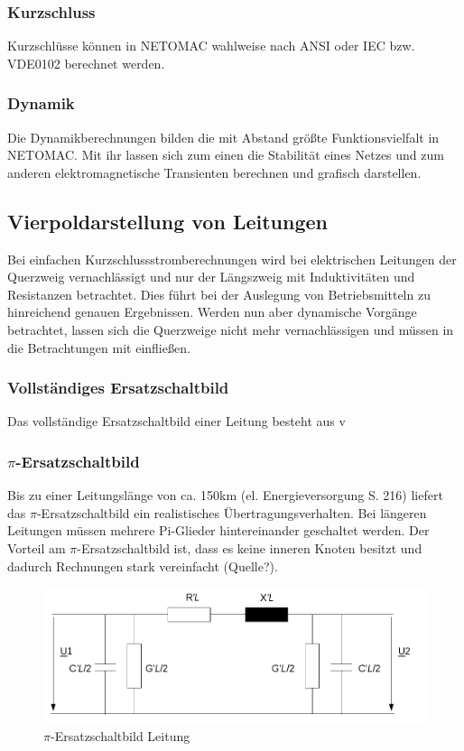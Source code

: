 \documentclass{scrartcl}
\begin{document}
\begin{onehalfspace}
\subsubsection{Kurzschluss}
Kurzschlüsse können in NETOMAC wahlweise nach ANSI oder IEC bzw. VDE0102 berechnet werden.


\subsubsection{Dynamik}
Die Dynamikberechnungen bilden die mit Abstand größte Funktionsvielfalt in NETOMAC. Mit ihr lassen sich zum einen die Stabilität eines Netzes und zum anderen elektromagnetische Transienten berechnen und grafisch darstellen.

\subsection{Vierpoldarstellung von Leitungen}
Bei einfachen Kurzschlussstromberechnungen wird bei elektrischen Leitungen der Querzweig vernachlässigt und nur der Längszweig mit Induktivitäten und Resistanzen betrachtet. Dies führt bei der Auslegung von Betriebsmitteln zu hinreichend genauen Ergebnissen. Werden nun aber dynamische Vorgänge betrachtet, lassen sich die Querzweige nicht mehr vernachlässigen und müssen in die Betrachtungen mit einfließen.

\subsubsection{Vollständiges Ersatzschaltbild}
Das vollständige Ersatzschaltbild einer Leitung besteht aus v

\subsubsection{$\pi$-Ersatzschaltbild}
Bis zu einer Leitungslänge von ca. 150km (el. Energieversorgung S. 216) liefert das $\pi$-Ersatzschaltbild ein realistisches Übertragungsverhalten. Bei längeren Leitungen müssen mehrere Pi-Glieder hintereinander geschaltet werden. Der Vorteil am $\pi$-Ersatzschaltbild ist, dass es keine inneren Knoten besitzt und dadurch Rechnungen stark vereinfacht (Quelle?).

	\begin{figure}[H]
	\centering
	\includegraphics[scale=0.5]{img/pi-esb.png}
	\caption{$\pi$-Ersatzschaltbild Leitung}
	\label{pi-esb}
	\end{figure}


\end{onehalfspace}
\end{document}

